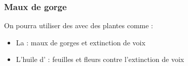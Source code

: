 \subsubsection{Maux de gorge}
On pourra utiliser des  avec des plantes comme :
\begin{itemize}[label=\bcfleur]
    \item La  : maux de gorges et extinction de voix
    \item L'huile d' : feuilles et fleurs contre l'extinction de voix
\end{itemize}